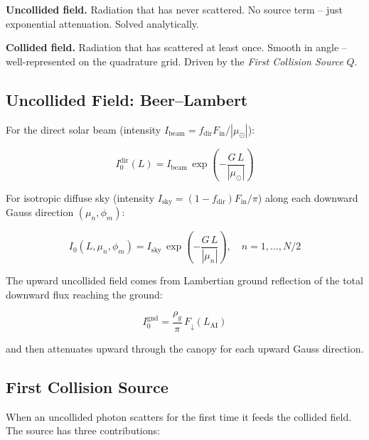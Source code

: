 \documentclass[12pt]{article}
\begin{document}
\begin{description}[nosep]
  \item[$I_0$:] \textbf{Uncollided field.} Radiation that has never scattered.
    No source term -- just exponential attenuation. Solved analytically.
  \item[$I_c$:] \textbf{Collided field.} Radiation that has scattered at least
    once. Smooth in angle -- well-represented on the quadrature grid.
    Driven by the \emph{First Collision Source} $Q$.
\end{description}

\subsection{Uncollided Field: Beer--Lambert}

For the direct solar beam (intensity $I_\mathrm{beam} = f_\mathrm{dir} F_\mathrm{in} / |\mu_\odot|$):

\begin{equation}
  I_0^\mathrm{dir}(L) = I_\mathrm{beam}\,
  \exp\!\left(-\frac{G\,L}{|\mu_\odot|}\right)
\end{equation}

For isotropic diffuse sky (intensity $I_\mathrm{sky} = (1-f_\mathrm{dir})F_\mathrm{in}/\pi$)
along each downward Gauss direction $(\mu_n, \phi_m)$:

\begin{equation}
  I_0(L, \mu_n, \phi_m) = I_\mathrm{sky}\,
  \exp\!\left(-\frac{G\,L}{|\mu_n|}\right), \quad n = 1,\ldots,N/2
\end{equation}

The upward uncollided field comes from Lambertian ground reflection of the
total downward flux reaching the ground:

\begin{equation}
  I_0^\mathrm{gnd} = \frac{\rho_g}{\pi}\,F_\downarrow(L_\mathrm{AI})
\end{equation}

and then attenuates upward through the canopy for each upward Gauss direction.

\subsection{First Collision Source}

When an uncollided photon scatters for the first time it feeds the collided
field. The source has three contributions:
\end{document}
